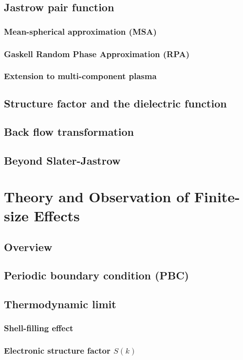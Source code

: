 \documentclass[draftthesis,fullpage]{uiucthesis}
\begin{document}
\section{Jastrow pair function}
\subsection{Mean-spherical approximation (MSA)}
\subsection{Gaskell Random Phase Approximation (RPA)}
\subsection{Extension to multi-component plasma}
\section{Structure factor and the dielectric function}
\section{Back flow transformation}
\section{Beyond Slater-Jastrow}

\chapter{Theory and Observation of Finite-size Effects}
\section{Overview}
\section{Periodic boundary condition (PBC)}
\section{Thermodynamic limit}
\subsection{Shell-filling effect}
\subsection{Electronic structure factor $S(k)$}
\end{document}
